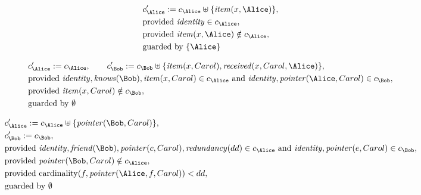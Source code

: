 \begin{align*}
&
c'_
{
\Alice
}
 := 
c_
{
\Alice
}
 \uplus 
\{
\mathit{
item
}
(
x
,
\Alice
)
\}
,\\
&
\text{provided } 
\mathit{
identity
}
 \in c_
{
\Alice
}
,\\
&
\text{provided } 
\mathit{
item
}
(
x
,
\Alice
)
 \notin c_
{
\Alice
}
,\\
&
\text{guarded by } \{
\Alice
\}
\end{align*}

\begin{align*}
&
c'_
{
\Alice
}
 := 
c_
{
\Alice
}
, \qquad 
c'_
{
\Bob
}
 := 
c_
{
\Bob
}
 \uplus 
\{
\mathit{
item
}
(
x
,
Carol
)
,
\mathit{
received
}
(
x
,
Carol
,
\Alice
)
\}
,\\
&
\text{provided } 
\mathit{
identity
}
,
\mathit{
knows
}
(
\Bob
)
,
\mathit{
item
}
(
x
,
Carol
)
 \in c_
{
\Alice
}
 \text{ and } 
\mathit{
identity
}
,
\mathit{
pointer
}
(
\Alice
,
Carol
)
 \in c_
{
\Bob
}
,\\
&
\text{provided } 
\mathit{
item
}
(
x
,
Carol
)
 \notin c_
{
\Bob
}
,\\
&
\text{guarded by } \emptyset
\end{align*}

\begin{align*}
&
c'_
{
\Alice
}
 := 
c_
{
\Alice
}
 \uplus 
\{
\mathit{
pointer
}
(
\Bob
,
Carol
)
\}
,\\
&
c'_
{
\Bob
}
 := 
c_
{
\Bob
}
,\\
&
\text{provided } 
\mathit{
identity
}
,
\mathit{
friend
}
(
\Bob
)
,
\mathit{
pointer
}
(
c
,
Carol
)
,
\mathit{
redundancy
}
(
dd
)
 \in c_
{
\Alice
}
 \text{ and } 
\mathit{
identity
}
,
\mathit{
pointer
}
(
e
,
Carol
)
 \in c_
{
\Bob
}
,\\
&
\text{provided } 
\mathit{
pointer
}
(
\Bob
,
Carol
)
 \notin c_
{
\Alice
}
,\\
&
\text{provided } 
\mathrm{cardinality}(
f
,
\mathit{
pointer
}
(
\Alice
,
f
,
Carol
)
)
<
dd
,\\
&
\text{guarded by } \emptyset
\end{align*}
